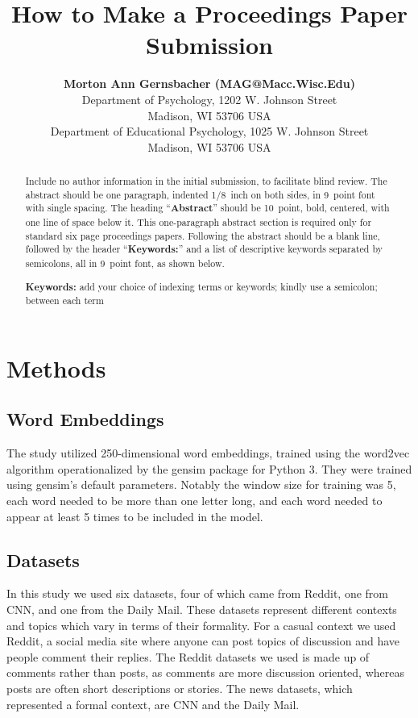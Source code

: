\documentclass[10pt,letterpaper]{article}
\title{How to Make a Proceedings Paper Submission}
\author{{\large \bf Morton Ann Gernsbacher (MAG@Macc.Wisc.Edu)} \\
  Department of Psychology, 1202 W. Johnson Street \\
  Madison, WI 53706 USA
  \AND {\large \bf Sharon J.~Derry (SDJ@Macc.Wisc.Edu)} \\
  Department of Educational Psychology, 1025 W. Johnson Street \\
  Madison, WI 53706 USA}
\begin{document}
\maketitle


\begin{abstract}
Include no author information in the initial submission, to facilitate
blind review.  The abstract should be one paragraph, indented 1/8~inch on both sides,
in 9~point font with single spacing. The heading ``{\bf Abstract}''
should be 10~point, bold, centered, with one line of space below
it. This one-paragraph abstract section is required only for standard
six page proceedings papers. Following the abstract should be a blank
line, followed by the header ``{\bf Keywords:}'' and a list of
descriptive keywords separated by semicolons, all in 9~point font, as
shown below.

\textbf{Keywords:} 
add your choice of indexing terms or keywords; kindly use a
semicolon; between each term
\end{abstract}

\section{Methods}

\subsection{Word Embeddings}

The study utilized 250-dimensional word embeddings, trained using the word2vec algorithm operationalized by the gensim package for Python 3. They were trained using gensim’s default parameters. Notably the window size for training was 5, each word needed to be more than one letter long, and each word needed to appear at least 5 times to be included in the model.

\subsection{Datasets}

In this study we used six datasets, four of which came from Reddit, one from CNN, and one from the Daily Mail. These datasets represent different contexts and topics which vary in terms of their formality. For a casual context we used Reddit, a social media site where anyone can post topics of discussion and have people comment their replies. The Reddit datasets we used is made up of comments rather than posts, as comments are more discussion oriented, whereas posts are often short descriptions or stories. The news datasets, which represented a formal context, are CNN and the Daily Mail.
\end{document}
